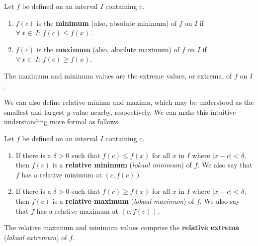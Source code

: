 \ifanalysis
\begin{definition}\label{def:extreme_values}
Let $f$ be defined on an interval $I$ containing $c$.
	\begin{enumerate}[align=left]
	\item		$f(c)$ is the \textbf{minimum} (also, absolute minimum) of $f$ on $I$ if 	$\forall\,x\in\,I:\,f(c) \leq f(x)$.
	\item		$f(c)$ is the \textbf{maximum} (also, absolute maximum) of $f$ on $I$ if $\forall\,x\in\,I:\,f(c) \geq f(x)$.
	\end{enumerate}
	The maximum and minimum values are the extreme values, or extrema, of $f$ on $I$.
\end{definition}
\fi






We can also define relative minima and maxima, which may be understood as the smallest and largest $y$-value nearby, respectively. We can make this intuitive understanding more formal as follows. 


\begin{definition}\label{def:rel_ext}
Let $f$ be defined on an interval $I$ containing $c$. 
		\begin{enumerate}[align=left]
		\item	If there is a $\delta>0$ such that $f(c) \leq f(x)$ for all $x$ in $I$ where $|x-c|<\delta$, then $f(c)$ is a \textbf{relative minimum} (\textit{lokaal minimum}) of $f$. We also say that $f$ has a relative minimum at $(c,f(c))$. 
		
		\item	If there is a $\delta>0$ such that $f(c) \geq f(x)$ for all $x$ in $I$ where $|x-c|<\delta$, then $f(c)$ is a \textbf{relative maximum} (\textit{lokaal maximum}) of $f$. We also say that $f$ has a relative maximum at $(c,f(c))$. 
		\end{enumerate}
		
The relative maximum and minimum values comprise the \textbf{relative extrema} (\textit{lokaal extremum}) of $f$.
\end{definition}







